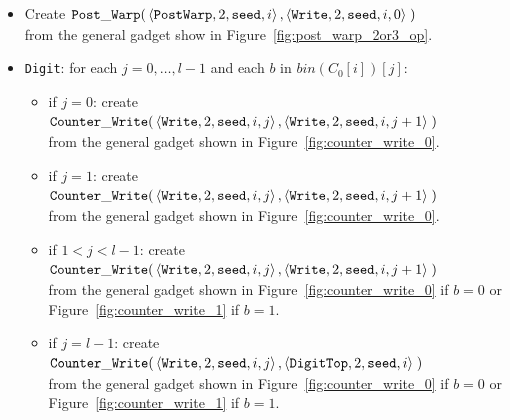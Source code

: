 \begin{itemize}
    \item Create
    $\begin{aligned}[t]
        {\tt Post\_Warp}(&\left\langle {\tt PostWarp}, 2, {\tt seed}, i    \right\rangle,
                   \left\langle {\tt Write},    2, {\tt seed}, i, 0 \right\rangle \;)
    \end{aligned}$\\ from the general gadget show in Figure~\ref{fig:post_warp_2or3_op}.

    \item {\tt Digit}: for each $j=0,\ldots,l-1$ and each $b$ in $bin(C_0[i])[j]$:
    \begin{itemize}
        \item if $j = 0$: create
        $\begin{aligned}[t]
            {\tt Counter\_Write}(&\left\langle {\tt Write}, 2, {\tt seed}, i, j \right\rangle, \left\langle {\tt Write}, 2, {\tt seed}, i, j + 1 \right\rangle \;)
        \end{aligned}$\\from the general gadget shown in Figure~\ref{fig:counter_write_0}.

        \item if $j = 1$: create
        $\begin{aligned}[t]
            {\tt Counter\_Write}(&\left\langle {\tt Write}, 2, {\tt seed}, i, j \right\rangle, \left\langle {\tt Write}, 2, {\tt seed}, i, j + 1 \right\rangle \;)
        \end{aligned}$\\from the general gadget shown in Figure~\ref{fig:counter_write_0}.

        \item if $1 < j < l-1$: create
        $\begin{aligned}[t]
            {\tt Counter\_Write}(&\left\langle {\tt Write}, 2, {\tt seed}, i, j \right\rangle, \left\langle {\tt Write}, 2, {\tt seed}, i, j + 1 \right\rangle \;)
        \end{aligned}$\\from the general gadget shown in Figure~\ref{fig:counter_write_0} if $b = 0$ or Figure~\ref{fig:counter_write_1} if $b = 1$.

        \item if $j = l-1$: create
        $\begin{aligned}[t]
            {\tt Counter\_Write}(&\left\langle {\tt Write}, 2, {\tt seed}, i, j \right\rangle, \left\langle {\tt DigitTop}, 2, {\tt seed}, i \right\rangle \;)
        \end{aligned}$\\from the general gadget shown in Figure~\ref{fig:counter_write_0} if $b = 0$ or Figure~\ref{fig:counter_write_1} if $b = 1$.
    \end{itemize}



\end{itemize}
